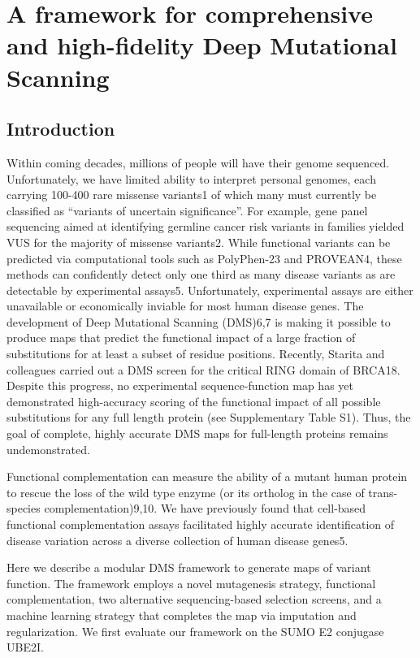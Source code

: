 

\chapter[High-fidelity and comprehensive DMS framework]{A framework for comprehensive and high-fidelity Deep Mutational Scanning}

\section{Introduction}

Within coming decades, millions of people will have their genome sequenced. Unfortunately, we have limited ability to interpret personal genomes, each carrying 100-400 rare missense variants1 of which many must currently be classified as “variants of uncertain significance”. For example, gene panel sequencing aimed at identifying germline cancer risk variants in families yielded VUS for the majority of missense variants2.  While functional variants can be predicted via computational tools such as PolyPhen-23 and PROVEAN4, these methods can confidently detect only one third as many disease variants as are detectable by experimental assays5. Unfortunately, experimental assays are either unavailable or economically inviable for most human disease genes. The development of Deep Mutational Scanning (DMS)6,7 is making it possible to produce maps that predict the functional impact of a large fraction of substitutions for at least a subset of residue positions. Recently, Starita and colleagues carried out a DMS screen for the critical RING domain of BRCA18. Despite this progress, no experimental sequence-function map has yet demonstrated high-accuracy scoring of the functional impact of all possible substitutions for any full length protein (see Supplementary Table S1). Thus, the goal of complete, highly accurate DMS maps for full-length proteins remains undemonstrated.

Functional complementation can measure the ability of a mutant human protein to rescue the loss of the wild type enzyme (or its ortholog in the case of trans-species complementation)9,10. We have previously found that cell-based functional complementation assays facilitated highly accurate identification of disease variation across a diverse collection of human disease genes5. 

Here we describe a modular DMS framework to generate maps of variant function. The framework employs a novel mutagenesis strategy, functional complementation, two alternative sequencing-based selection screens, and a machine learning strategy that completes the map via imputation and regularization. We first evaluate our framework on the SUMO E2 conjugase UBE2I.

